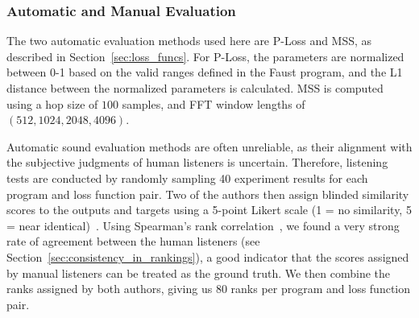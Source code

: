 \documentclass[lettersize,journal]{IEEEtran}
\newcommand{\BPNoise}{\textbf{BP-Noise}}
\newcommand{\AddSineSaw}{\textbf{Add-SineSaw}}
\newcommand{\AmpMod}{\textbf{Noise-AM}}
\newcommand{\FMMod}{\textbf{SineSaw-AM}}
\begin{document}
\subsubsection{Automatic and Manual Evaluation}
\label{sec:evaluation_manual_auto}
The two automatic evaluation methods used here are P-Loss and MSS, as described in Section~\ref{sec:loss_funcs}. For P-Loss, the parameters are normalized between 0-1 based on the valid ranges defined in the Faust program, and the L1 distance between the normalized parameters is calculated. MSS is computed using a hop size of $100$ samples, and FFT window lengths of $(512, 1024, 2048, 4096)$. 

Automatic sound evaluation methods are often unreliable, as their alignment with the subjective judgments of human listeners is uncertain. Therefore, listening tests are conducted by randomly sampling 40 experiment results for each program and loss function pair. Two of the authors then assign blinded similarity scores to the outputs and targets using a 5-point Likert scale (1 = no similarity, 5 = near identical)~\cite{jebb2021review}. Using Spearman's rank correlation~\cite{spearman1987proof,rebekic2015pearson}, we found a very strong rate of agreement between the human listeners (see Section~\ref{sec:consistency_in_rankings}), a good indicator that the scores assigned by manual listeners can be treated as the ground truth. We then combine the ranks assigned by both authors, giving us 80 ranks per program and loss function pair. 



\end{document}
